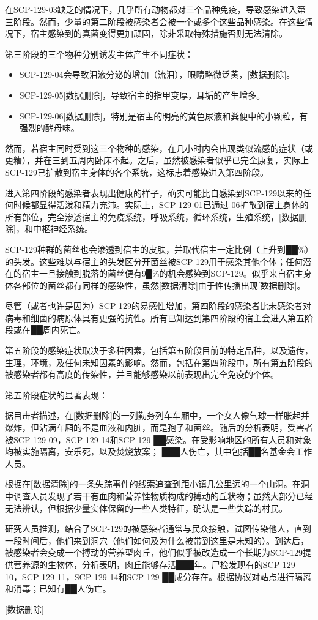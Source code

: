 在SCP-129-03缺乏的情况下，几乎所有动物都对三个品种免疫，导致感染进入第三阶段。然而，少量的第二阶段被感染者会被一个或多个这些品种感染。在这些情况下，宿主感染到的真菌变得更加顽固，除非采取特殊措施否则无法清除。

第三阶段的三个物种分别诱发主体产生不同症状：

\begin{itemize}
\item SCP-129-04会导致泪液分泌的增加（流泪），眼睛略微泛黄，{[}数据删除]。
\item SCP-129-05{[}数据删除]，导致宿主的指甲变厚，耳垢的产生增多。
\item SCP-129-06{[}数据删除]，特别是宿主的明亮的黄色尿液和粪便中的小颗粒，有强烈的酵母味。
\end{itemize}

然而，若宿主同时受到这三个物种的感染，在几小时内会出现类似流感的症状（或更糟），并在三到五周内卧床不起。之后，虽然被感染者似乎已完全康复，实际上SCP-129已扩散到宿主身体的各个系统，这标志着感染进入第四阶段。

进入第四阶段的感染者表现出健康的样子，确实可能比自感染到SCP-129以来的任何时候都显得活泼和精力充沛。实际上，SCP-129-01已通过-06扩散到宿主身体的所有部位，完全渗透宿主的免疫系统，呼吸系统，循环系统，生殖系统，{[}数据删除]，和中枢神经系统。

SCP-129种群的菌丝也会渗透到宿主的皮肤，并取代宿主一定比例（上升到██\%）的头发。这些难以与宿主的头发区分开菌丝被SCP-129用于感染其他个体；任何潜在的宿主一旦接触到脱落的菌丝便有9█\%的机会感染到SCP-129。似乎来自宿主身体各部位的菌丝都有同样的感染性，虽然{[}数据清除]由于性传播出现{[}数据删除]。

尽管（或者也许是因为）SCP-129的易感性增加，第四阶段的感染者比未感染者对病毒和细菌的病原体具有更强的抗性。所有已知达到第四阶段的宿主会进入第五阶段或在██周内死亡。

第五阶段的感染症状取决于多种因素，包括第五阶段目前的特定品种，以及遗传，生理，环境，及任何未知因素的影响。然而，包括在第四阶段中，所有第五阶段的被感染者都有高度的传染性，并且能够感染以前表现出完全免疫的个体。

第五阶段症状的显著表现：

据目击者描述，在{[}数据删除]的一列勤务列车车厢中，一个女人像气球一样胀起并爆炸，但沾满车厢的不是血液和内脏，而是孢子和菌丝。随后的分析表明，受害者被SCP-129-09，SCP-129-14和SCP-129-██感染。在受影响地区的所有人员和对象均被实施隔离，安乐死，以及焚烧放案； ███人伤亡，其中包括██名基金会工作人员。

根据在{[}数据清除]的一条失踪事件的线索追查到距小镇几公里远的一个山洞。在洞中调查人员发现了若干有血肉和营养性物质构成的搏动的丘状物；虽然大部分已经无法辨认，但根据少量实体保留的一些人类特征，确认是一些失踪的村民。

研究人员推测，结合了SCP-129的被感染者通常与民众接触，试图传染他人，直到一段时间后，他们来到洞穴（他们如何及为什么被带到这里是未知的）。到达后，被感染者会变成一个搏动的营养型肉丘，他们似乎被改造成一个长期为SCP-129提供营养源的生物体，分析表明，肉丘能够存活███年。尸检发现有的SCP-129-10，SCP-129-11，SCP-129-14和SCP-129-██成分存在。根据协议对站点进行隔离和消毒；已知有██人伤亡。

{[}数据删除]

